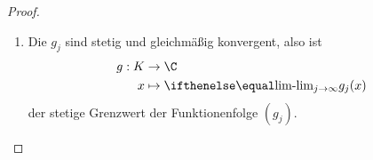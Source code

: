 \begin{st}
\begin{proof}
\begin{enumerate}[1)]
					Sei dazu $ \eps>0 $ beliebig. 
					Wähle $ \delta >0 $ passend zu $\eps$ gemäß der gleichgradigen Stetigkeit der Funktionen $g_j$ (ererbt von $f_j$, da Teilfolgen), also:
					\[
						\forall x,x' \in K \forall j \in \N : \|x - x'\| < \delta \implies | g_j(x) - g_j(x') | < \eps.
					\]
					\begin{enumerate}[a)]
						\item
							Wähle $\{\xi_{l_1}, \dotsc, \xi_{l_N} \}\subset M$ so dass $K \subset \bigcup_{m=1}^N K_\delta (\xi_{l_m})$ (funktioniert, da $K$ (üb"-er"-deck"-ungs-)kompakt, siehe Konstruktion von $M$).
						\item
							Da $g_j$ punktweise konvergent (weil Teilfolgen von $f_j$), wähle $J \in \N$, sodass 
							\[
								\forall j,k > J \forall m \in \{1, \dotsc, N\} : \big| g_j(\xi_{l_m}) - g_k(\xi_{l_m}) \big| < \eps.
							\]
					\end{enumerate}
					Wir finden jetzt für jedes $ x $ ein $ \xi_{l_i}, i\in\{1,...,N\} $, sodass $ x \in K_\delta(\xi_{l_i}) $.
					Wegen
					\begin{enumerate}[(I)]
						\item $\big|g_j(x)-g_j(\xi_{l_i})\big|< \eps$ da $|x-\xi_{l_i}|<\delta$,
						\item $ \big|g_j(\xi_{l_i}) - g_k(\xi_{l_i})\big| <\eps$ da $j,k > J$,
						\item $ \big| g_k(\xi_{l_i}) - g_k(x)\big| <\eps$ da $|x-\xi_{l_i}| < \delta$
					\end{enumerate}
					gilt
					\begin{align*}
						|g_j(x) - g_k(x)| 
						&\le \underbrace{\big|g_j(x)-g_j(\xi_{l_i})\big|}_{\text{(I)}} 
							+ \underbrace{\big|g_j(\xi_{l_i}) - g_k(\xi_{l_i})\big|}_{\text{(II)}}  
							+ \underbrace{\big| g_k(\xi_{l_i}) - g_k(x)\big|}_{\text{(III)}}. \\
						&< 3\eps
					\end{align*}
					für alle $j,k > J$, $x\in K$.
					Also konvergiert $(g_j)$ gleichmäßig in $K$.
			\item
				Die $g_j$ sind stetig und gleichmäßig konvergent, also ist
				\begin{align*}
					g: K &\to \C \\
					x &\mapsto \lim_{j\to \infty} g_j(x)
				\end{align*}
				der stetige Grenzwert der Funktionenfolge $ (g_j) $.
		\end{enumerate}
	\end{proof}
\end{st}
